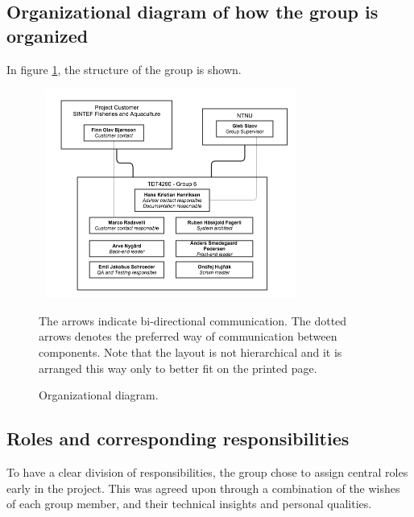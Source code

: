 \documentclass[11pt,a4paper,titlepage,oneside]{report}
\begin{document}
\subsection{Organizational diagram of how the group is organized}
In figure \ref{fig:organizational-structure}, the structure of the group is shown. 

\begin{figure}[h]
\begin{center}
\includegraphics[height=260px,width=328px]{img/tdt4290_group_6_organizational_structure.png}
\caption{Organizational diagram.}
\label{fig:organizational-structure}
\medskip
\small
The arrows indicate bi-directional communication. The dotted arrows denotes the preferred way of communication between components. Note that the layout is not hierarchical and it is arranged this way only to better fit on the printed page.
\end{center}
\end{figure}

\subsection{Roles and corresponding responsibilities}
To have a clear division of responsibilities, the group chose to assign central roles early in the project. This was agreed upon through a combination of the wishes of each group member, and their technical insights and personal qualities. 
\end{document}
